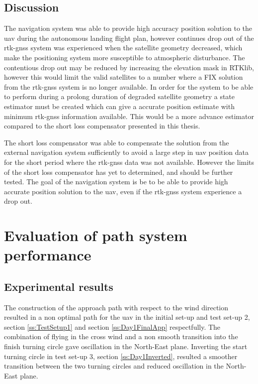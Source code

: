 \subsection{Discussion}
The navigation system was able to provide high accuracy position solution to the \gls{uav} during the autonomous landing flight plan, however continues drop out of the \gls{rtk-gnss} system was experienced when the satellite geometry decreased, which make the positioning system more susceptible to atmospheric disturbance. The contentious drop out may be reduced by increasing the elevation mask in RTKlib, however this would limit the valid satellites to a number where a FIX solution from the \gls{rtk-gnss} system is no longer available. In order for the system to be able to perform during a prolong duration of degraded satellite geometry a state estimator must be created which can give a accurate position estimate with minimum \gls{rtk-gnss} information available. This would be a more advance estimator compared to the short loss compensator presented in this thesis.

The short loss compensator was able to compensate the solution from the external navigation system sufficiently to avoid a large step in \gls{uav} position data for the short period where the \gls{rtk-gnss} data was not available. However the limits of the short loss compensator has yet to determined, and should be further tested. The goal of the navigation system is be to be able to provide high accurate position solution to the \gls{uav}, even if the \gls{rtk-gnss} system experience a drop out.
\section{Evaluation of path system performance}
\subsection{Experimental results}
The construction of the approach path with respect to the wind direction resulted in a non optimal path for the \gls{uav} in the initial set-up and test set-up 2, section \ref{ss:TestSetup1} and section \ref{ss:Day1FinalApp} respectfully. The combination of flying in the cross wind and a non smooth transition into the finish turning circle gave oscillation in the North-East plane. Inverting the start turning circle in test set-up 3, section \ref{ss:Day1Inverted}, resulted a smoother transition between the two turning circles and reduced oscillation in the North-East plane.

